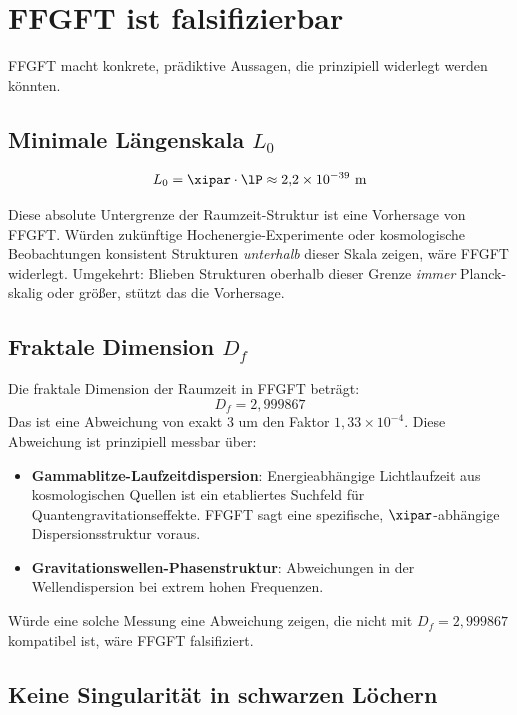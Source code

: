 \section{FFGFT ist falsifizierbar}

FFGFT macht konkrete, prädiktive Aussagen, die prinzipiell widerlegt werden könnten.

\subsection{Minimale Längenskala $L_0$}

\begin{equation}
  L_0 = \xipar \cdot \lP \approx 2{,}2 \times 10^{-39} \text{ m}
\end{equation}

Diese absolute Untergrenze der Raumzeit-Struktur ist eine Vorhersage von FFGFT. Würden zukünftige Hochenergie-Experimente oder kosmologische Beobachtungen konsistent Strukturen \emph{unterhalb} dieser Skala zeigen, wäre FFGFT widerlegt. Umgekehrt: Blieben Strukturen oberhalb dieser Grenze \emph{immer} Planck-skalig oder größer, stützt das die Vorhersage.

\subsection{Fraktale Dimension $D_f$}

Die fraktale Dimension der Raumzeit in FFGFT beträgt:
\begin{equation}
  D_f = 2{,}999867
\end{equation}
Das ist eine Abweichung von exakt 3 um den Faktor $1{,}33 \times 10^{-4}$. Diese Abweichung ist prinzipiell messbar über:
\begin{itemize}
  \item \textbf{Gammablitze-Laufzeitdispersion}: Energieabhängige Lichtlaufzeit aus kosmologischen Quellen ist ein etabliertes Suchfeld für Quantengravitationseffekte. FFGFT sagt eine spezifische, $\xipar$-abhängige Dispersionsstruktur voraus.
  \item \textbf{Gravitationswellen-Phasenstruktur}: Abweichungen in der Wellendispersion bei extrem hohen Frequenzen.
\end{itemize}
Würde eine solche Messung eine Abweichung zeigen, die nicht mit $D_f = 2{,}999867$ kompatibel ist, wäre FFGFT falsifiziert.

\subsection{Keine Singularität in schwarzen Löchern}

